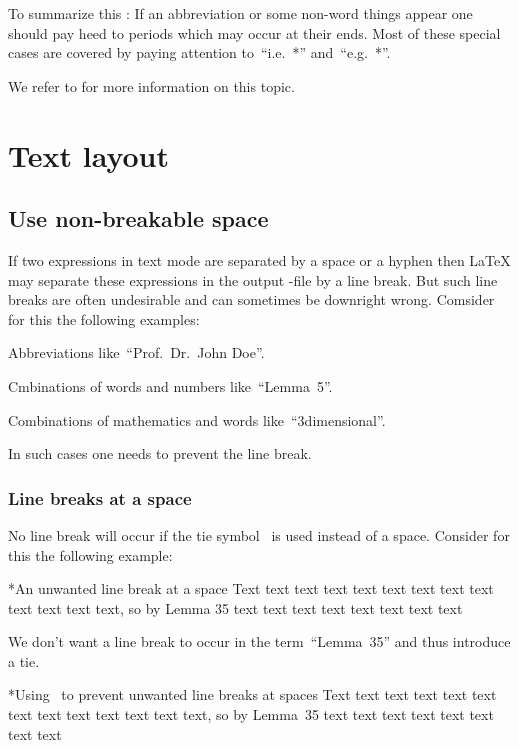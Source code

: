 To summarize this :
If an abbreviation or some non-word things appear one should pay heed to periods which may occur at their ends.
Most of these special cases are covered by paying attention to~\enquote{i.e.~*} and~\enquote{e.g.~*}.

We refer to \cite[19.5.1, 19.6]{latex2e_manual} for more information on this topic.






\section{Text layout}



\subsection{Use non-breakable space}
\label{non-breakable space}

If two expressions in text mode are separated by a space or a hyphen then {\LaTeX} may separate these expressions in the output -file by a line break.
But such line breaks are often undesirable and can sometimes be downright wrong.
Comsider for this the following examples:
\begin{myitemize}
  \item
    Abbreviations like~\enquote{Prof.~Dr.~John Doe}.
  \item
    Cmbinations of words and numbers like~\enquote{Lemma~5}.
  \item
    Combinations of mathematics and words like~\enquote{$3${\nbd}dimensional}.
\end{myitemize}
In such cases one needs to prevent the line break.

\subsubsection{Line breaks at a space}

No line break will occur if the tie\index{\customtexttilde} symbol~\inlinecode{\customtexttilde} is used instead of a space.
Consider for this the following example:
\begin{showlatex}*{An unwanted line break at a space}
Text text text text text text text text text text text text text, so by Lemma 35 text text text text text text text text
\end{showlatex}
We don’t want a line break to occur in the term~\enquote{Lemma~35} and thus introduce a tie.
\begin{showlatex}*{Using~\inlinecode{\customtexttilde} to prevent unwanted line breaks at spaces}
Text text text text text text text text text text text text text, so by Lemma~35 text text text text text text text text
\end{showlatex}

